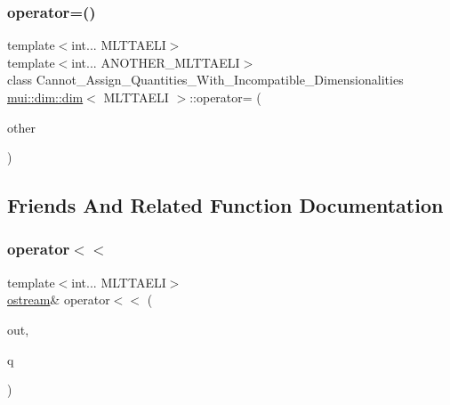\subsubsection{\texorpdfstring{operator=()}{operator=()}\hspace{0.1cm}{\footnotesize\ttfamily [2/2]}}
{\footnotesize\ttfamily template$<$int... M\+L\+T\+T\+A\+E\+LI$>$ \\
template$<$int... A\+N\+O\+T\+H\+E\+R\+\_\+\+M\+L\+T\+T\+A\+E\+LI$>$ \\
class Cannot\+\_\+\+Assign\+\_\+\+Quantities\+\_\+\+With\+\_\+\+Incompatible\+\_\+\+Dimensionalities \hyperlink{structmui_1_1dim_1_1dim}{mui\+::dim\+::dim}$<$ M\+L\+T\+T\+A\+E\+LI $>$\+::operator= (\begin{DoxyParamCaption}\item[{const \hyperlink{structmui_1_1dim_1_1dim}{dim}$<$ A\+N\+O\+T\+H\+E\+R\+\_\+\+M\+L\+T\+T\+A\+E\+L\+I... $>$ \&}]{other }\end{DoxyParamCaption})}



\subsection{Friends And Related Function Documentation}
\mbox{\label{structmui_1_1dim_1_1dim_a3e283b43c057fa9d4ffa33f88c7bb7fd}} 
\subsubsection{\texorpdfstring{operator$<$$<$}{operator<<}}
{\footnotesize\ttfamily template$<$int... M\+L\+T\+T\+A\+E\+LI$>$ \\
\hyperlink{classmui_1_1ostream}{ostream}\& operator$<$$<$ (\begin{DoxyParamCaption}\item[{\hyperlink{classmui_1_1ostream}{ostream} \&}]{out,  }\item[{\hyperlink{structmui_1_1dim_1_1dim}{dim}$<$ M\+L\+T\+T\+A\+E\+LI $>$}]{q }\end{DoxyParamCaption})\hspace{0.3cm}{\ttfamily [friend]}}

\mbox{\label{structmui_1_1dim_1_1dim_a933072e8c2019385aba3cbfcd6469186}} 
